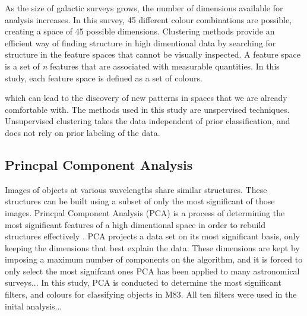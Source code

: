 As the size of galactic surveys grows, the number of dimensions available for analysis increases.
In this survey, 45 different colour combinations are possible, creating a space of 45 possible dimensions. 
Clustering methods provide an efficient way of finding structure in high dimentional data by searching for structure in the feature spaces that cannot be visually inspected. 
A feature space is a set of \textit{n} features that are associated with measurable quantities. 
In this study, each feature space is defined as a set of colours.

which can lead to the discovery of new patterns in spaces that we are already comfortable with. 
The methods used in this study are unspervised techniques. Unsupervised clustering takes the data independent of prior classification, and does not rely on prior labeling of the data.

\subsection{Princpal Component Analysis}
Images of objects at various wavelengths share similar structures. These structures can be built using a subset of only the most significant of those images.  
Princpal Component Analysis (PCA) is a process of determining the most significant features of a high dimentional space in order to rebuild structures effectively \citet{kuntzer16}.
PCA projects a data set on its most significant basis, only keeping the dimensions that best explain the data. 
These dimensions are kept by imposing a maximum number of components on the algorithm, and it is forced to only select the most signifcant ones \citet{kuntzer16}
PCA has been applied to many astronomical surveys... %
In this study, PCA is conducted to determine the most significant filters, and colours for classifying objects in M83.
All ten filters were used in the inital analysis... %


